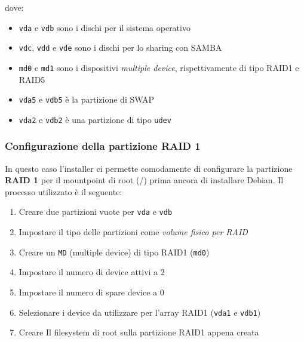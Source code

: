 \documentclass[11pt]{article}
\begin{document}
dove:
\begin{itemize}
    \item \texttt{vda} e \texttt{vdb} sono i dischi per il sistema operativo
    \item \texttt{vdc}, \texttt{vdd} e \texttt{vde} sono i dischi per lo sharing con SAMBA
    \item \texttt{md0} e \texttt{md1} sono i dispositivi \textit{multiple device}, rispettivamente di tipo RAID1 e RAID5
    \item \texttt{vda5} e \texttt{vdb5} è la partizione di SWAP
    \item \texttt{vda2} e \texttt{vdb2} è una partizione di tipo \texttt{udev}    
\end{itemize}

\pagebreak

\subsubsection{Configurazione della partizione RAID 1}
In questo caso l'installer ci permette comodamente di configurare la partizione \textbf{RAID 1} per il mountpoint di root (/) prima ancora di installare Debian. Il processo utilizzato è il seguente:

\begin{enumerate}
    \item Creare due partizioni vuote per \texttt{vda} e \texttt{vdb}
    \item Impostare il tipo delle partizioni come \textit{volume fisico per RAID}
    \item Creare un \texttt{MD} (multiple device) di tipo RAID1 (\texttt{md0})
    \item Impostare il numero di device attivi a 2
    \item Impostare il numero di spare device a 0
    \item Selezionare i device da utilizzare per l'array RAID1 (\texttt{vda1} e \texttt{vdb1})
    \item Creare Il filesystem di root sulla partizione RAID1 appena creata
\end{enumerate}
\end{document}
